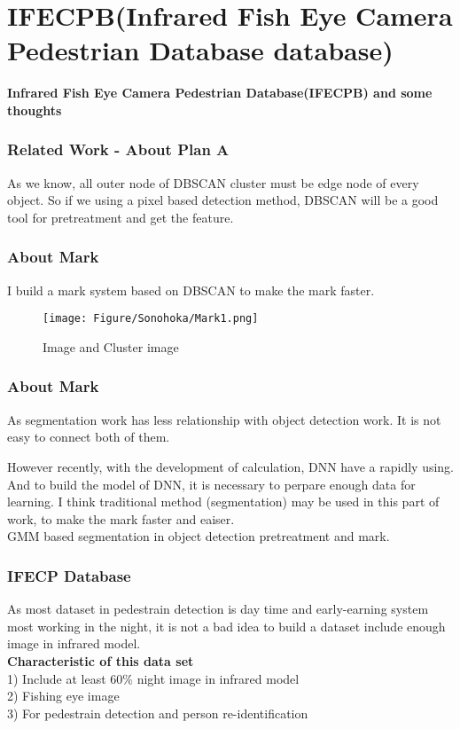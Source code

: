 \documentclass{beamer}
\begin{document}
\section{IFECPB(Infrared Fish Eye Camera Pedestrian Database database)}
\begin{frame}
\textbf{Infrared Fish Eye Camera Pedestrian Database(IFECPB) and some thoughts}
\end{frame}



\begin{frame}
\frametitle{Related Work - About Plan A}
As we know, all outer node of DBSCAN cluster must be edge node of every object. So if we using a pixel based detection method, DBSCAN will be a good tool for pretreatment and get the feature.
\end{frame}



\begin{frame}
\frametitle{About Mark}
I build a mark system based on DBSCAN to make the mark faster.
\begin{figure}[H]
\centering
\texttt{[image: Figure/Sonohoka/Mark1.png]}
\caption{Image and Cluster image}
\end{figure}
\end{frame}



\begin{frame}
\frametitle{About Mark}
As segmentation work has less relationship with object detection work.\cite{Nguyen2016} It is not easy to connect both of them.

However recently, with the development of calculation, DNN have a rapidly using. And to build the model of DNN, it is necessary to perpare enough data for learning. I think traditional method (segmentation) may be used in this part of work, to make the mark faster and eaiser.\\[3ex]

GMM based segmentation in object detection pretreatment and mark.
\end{frame}



\begin{frame}
\frametitle{IFECP Database}
As most dataset in pedestrain detection is day time and early-earning system most working in the night, it is not a bad idea to build a dataset include enough image in infrared model.
\\[2ex]
\textbf{Characteristic of this data set}
\\1) Include at least $60\%$ night image in infrared model
\\2) Fishing eye image
\\3) For pedestrain detection and person re-identification
\end{frame}
\end{document}
